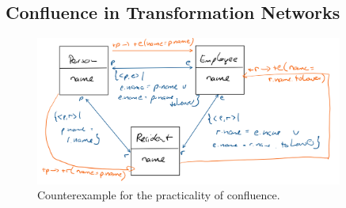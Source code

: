 


\subsection{Confluence in Transformation Networks}

\begin{figure}
    \centering
    \includegraphics[width=0.9\textwidth]{figures/correctness/orchestration/confluence.png}
    \caption[Confluence of transformations]{Counterexample for the practicality of confluence.}
    \label{fig:orchestration:confluence}
\end{figure}


